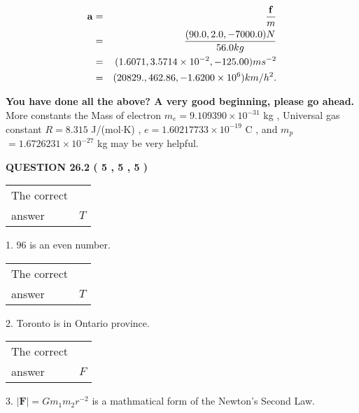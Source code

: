\documentclass[12pt]{article}
\begin{document}
\begin{eqnarray*}
\mathbf{a}&=&\frac{\mathbf{f}}m  \\
&=&\frac{(
90.0 ,
2.0 ,
-7000.0 )N
}{ %
56.0 kg}  \\
&=&(
1.6071 ,
3.5714 \times 10^{-2},
-125.00
)ms^{-2} \\
&=&(
20829. ,
462.86 ,
-1.6200 \times 10^{6}
)km/h^2.
\end{eqnarray*}
 
 
 
   
   
\vspace{0.3in}
{\textbf{\LARGE{You have done all the above? A very good beginning, please go ahead.}}}
More constants the
Mass of electron
$m_e$$ =
9.109390 \times 10^{-31} $
kg
,
Universal gas constant
$R$$ =
8.315 $
J/(mol$\cdot $K)
,
$e$$ =
1.60217733 \times 10^{-19} $
C
, and
$m_p$$ =
1.6726231 \times 10^{-27} $
kg
%
may be very helpful.
\vspace{0.3in}
   
   
  
\vspace{0.2in}
  
{\textbf{\Large{QUESTION
26.2 
 (           5 ,           5 ,           5 )
}}}
  
  
 
 
\noindent{}

 
\noindent\begin{tabular}{|l|l|}\hline The correct & \\
          answer &  %
$T$ \\ \hline \end{tabular}
1. $ %
96$ is an  %
even number.
 
\noindent\begin{tabular}{|l|l|}\hline The correct & \\
          answer &  %
$T$ \\ \hline \end{tabular}
2.  %
Toronto is in  %
Ontario province.
 
\noindent\begin{tabular}{|l|l|}\hline The correct & \\
          answer &  %
$F$ \\ \hline \end{tabular}
3.  %
$\left| \mathbf{F}\right| =Gm_1m_2r^{-2}$ is a mathmatical form of  %
the Newton's Second Law.
 
\end{document}
